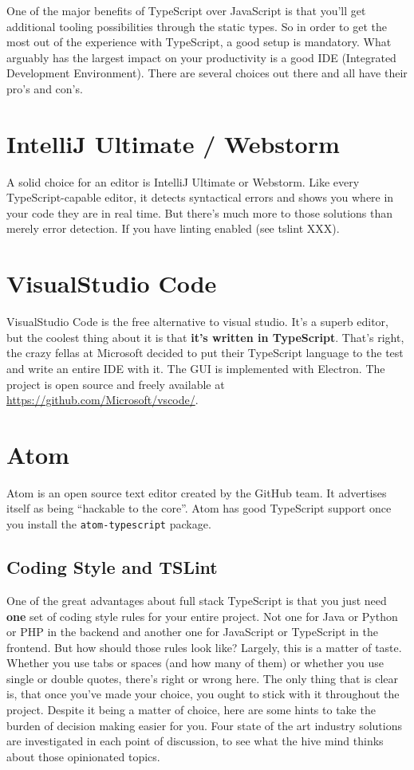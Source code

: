 \documentclass[12pt,a4paper]{report}
\begin{document}
One of the major benefits of TypeScript over JavaScript is that you'll get additional tooling possibilities through the static types. So in order to get the most out of the experience with TypeScript, a good setup is mandatory. What arguably has the largest impact on your productivity is a good IDE (Integrated Development Environment). There are several choices out there and all have their pro's and con's.

\section{IntelliJ Ultimate / Webstorm}
A solid choice for an editor is IntelliJ Ultimate or Webstorm. Like every TypeScript-capable editor, it detects syntactical errors and shows you where in your code they are in real time. But there's much more to those solutions than merely error detection. If you have linting enabled (see tslint XXX).

\section{VisualStudio Code}
VisualStudio Code is the free alternative to visual studio. It's a superb editor, but the coolest thing about it is that \textbf{it's written in TypeScript}. That's right, the crazy fellas at Microsoft decided to put their TypeScript language to the test and write an entire IDE with it. The GUI is implemented with Electron. The project is open source and freely available at \url{https://github.com/Microsoft/vscode/}.





\section{Atom}
Atom is an open source text editor created by the GitHub team. It advertises itself as being ``hackable to the core''. Atom has good TypeScript support once you install the \texttt{atom-typescript} package.


\subsection{Coding Style and TSLint}
One of the great advantages about full stack TypeScript is that you just need \textbf{one} set of coding style rules for your entire project. Not one for Java or Python or PHP in the backend and another one for JavaScript or TypeScript in the frontend. But how should those rules look like? Largely, this is a matter of taste. Whether you use tabs or spaces (and how many of them) or whether you use single or double quotes, there's right or wrong here. The only thing that is clear is, that once you've made your choice, you ought to stick with it throughout the project. Despite it being a matter of choice, here are some hints to take the burden of decision making easier for you. Four state of the art industry solutions are investigated in each point of discussion, to see what the hive mind thinks about those opinionated topics.
\end{document}
